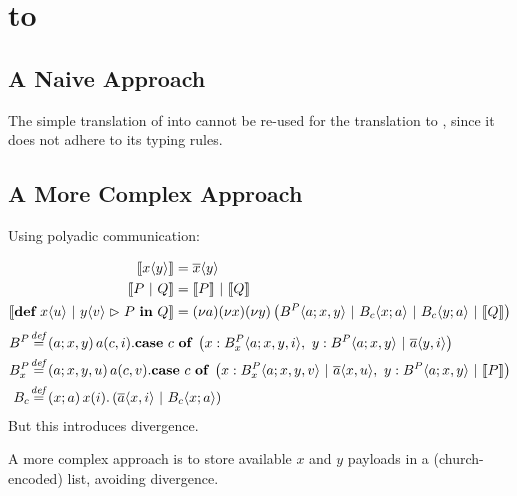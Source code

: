 \section{\MonadicJoinCalc to \ActorPiCalc}

\subsection{A Naive Approach}

The simple translation of \joincalc into \asyncpicalc \cite{fournet_reflexive_1996} cannot be re-used for the translation to \actorpicalc,
since it does not adhere to its typing rules.




\subsection{A More Complex Approach}

Using polyadic communication:

\begin{align}
  \begin{split}
    \encMJtoAP{\jsnd{x}{y}}
    &= \asnd{x}{y} \\
    \encMJtoAP{P \jpar Q}
    &= \encMJtoAP{P} \apar \encMJtoAP{Q} \\
    \encMJtoAP{\jdef{\jrct{\jrcv{x}{u} \jpat \jrcv{y}{v}}{P}}{Q}}
    &= \anew{a}{\anew{x}{\anew*{y}{ \ains{B^P}{a}{x,y} \apar \ains{B_c}{x}{a} \apar \ains{B_c}{y}{a} \apar \encMJtoAP{Q}}}} \\
  \end{split}
\end{align}
\begin{align}
  \adef*{B^P}{a}{x,y}{
    \arcv{a}{c,i} . \acse{c}{
       \aalt{x}{\ains{B_x^P}{a}{x,y,i}},\ 
       \aalt{y}{\ains{B^P}{a}{x,y} \apar \asnd{a}{y,i}}
     }
  } \\
  \adef*{B_x^P}{a}{x,y,u}{
    \arcv{a}{c,v} . \acse{c}{
      \aalt{x}{\ains{B_x^P}{a}{x,y,v} \apar \asnd{a}{x,u}},\ 
      \aalt{y}{\ains{B^P}{a}{x,y} \apar \encMJtoAP{P}}
    } \\
  }
  \adef*{B_c}{x}{a}{
    \arcv{x}{i} . \parens{\asnd{a}{x,i} \apar \ains{B_c}{x}{a}}
  }
\end{align}
But this introduces divergence.


A more complex approach is to store available $x$ and $y$ payloads in a (church-encoded) list, avoiding divergence.

